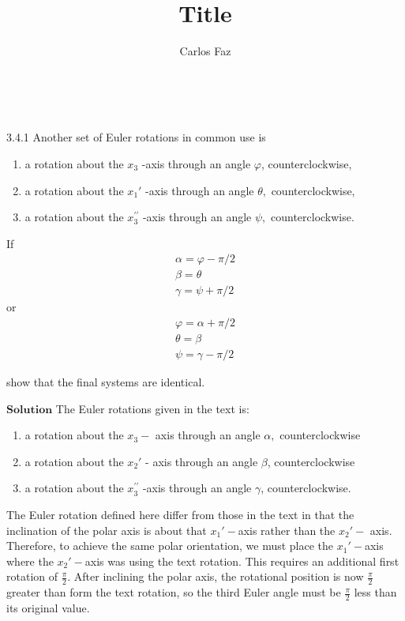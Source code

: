 \documentclass{article}
\title{Title}
\author{Carlos Faz}
\date{ \ }
\begin{document}
\begin{flushleft}




\begin{mybox}{3.4.1}
Another set of Euler rotations in common use is
\begin{enumerate}[$(a)$]
\item a rotation about the $x_{3}$ -axis through an angle $\varphi$, counterclockwise,
\item a rotation about the $x_{1}'$ -axis through an angle $\theta,$ counterclockwise,
\item a rotation about the $x_{3}^{\prime \prime}$ -axis through an angle $\psi,$ counterclockwise. 
\end{enumerate}
\begin{multicols}{2}
If 
$$
\begin{array}{l}
\alpha=\varphi-\pi / 2 \\
\beta=\theta \\
\gamma=\psi+\pi / 2
\end{array}
$$
or
$$
\begin{array}{l}
\varphi=\alpha+\pi / 2 \\
\theta=\beta \\
\psi=\gamma-\pi / 2
\end{array}
$$
\end{multicols}
show that the final systems are identical.
\end{mybox}

$\boxed{\textbf{Solution}}$ The Euler rotations given in the text is:
\begin{enumerate}
\item a rotation about the $x_{3}-$ axis through an angle $\alpha,$ counterclockwise
\item a rotation about the $x_{2}'$ - axis through an angle $\beta$, counterclockwise
\item a rotation about the $x_{3}^{\prime \prime}$ -axis through an angle $\gamma$, counterclockwise.
\end{enumerate}
The Euler rotation defined here differ from those in the text in that the inclination of the polar axis is about that $x_{1}'-$axis rather than the $x_{2}'-$ axis. Therefore, to achieve the same polar orientation, we must place the $x_{1}'-$axis where the $x_{2}'-$axis was using the text rotation. This requires an additional first rotation of $\frac{\pi}{2}$. After inclining the polar axis, the rotational position
is now $\frac{\pi}{2}$ greater than form the text rotation, so the third Euler angle must be $\frac{\pi}{2}$ less than its original value.


\end{flushleft}
\end{document}
